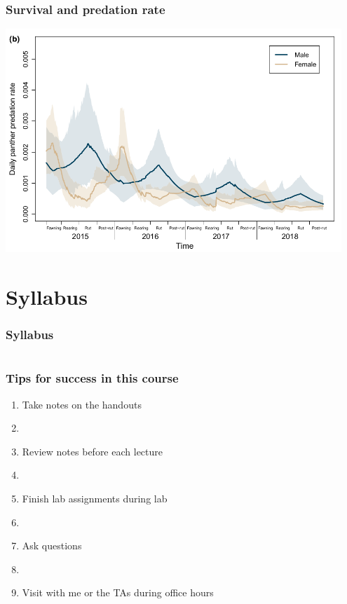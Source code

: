 \documentclass[color=usenames,dvipsnames]{beamer}
\begin{document}
\begin{frame}
  \frametitle{Survival and predation rate}
  \centering
  \includegraphics[width=0.95\textwidth]{figs/deer-pred-time} \\
\end{frame}






\section{Syllabus}




\begin{frame}
  \frametitle{Syllabus}
  \begin{columns}%
    \begin{column}{0.5\textwidth}
    \end{column}
  \end{columns}
\end{frame}






\begin{frame}
  \frametitle{Tips for success in this course}
  \begin{enumerate}[(1)]
    \Large
    \item Take notes on the handouts 
    \item[]
    \item Review notes before each lecture 
    \item[]
    \item Finish lab assignments during lab %
    \item[]
    \item Ask questions %
    \item[]
    \item Visit with me or the TAs during office hours %
  \end{enumerate}
\end{frame}
\end{document}
